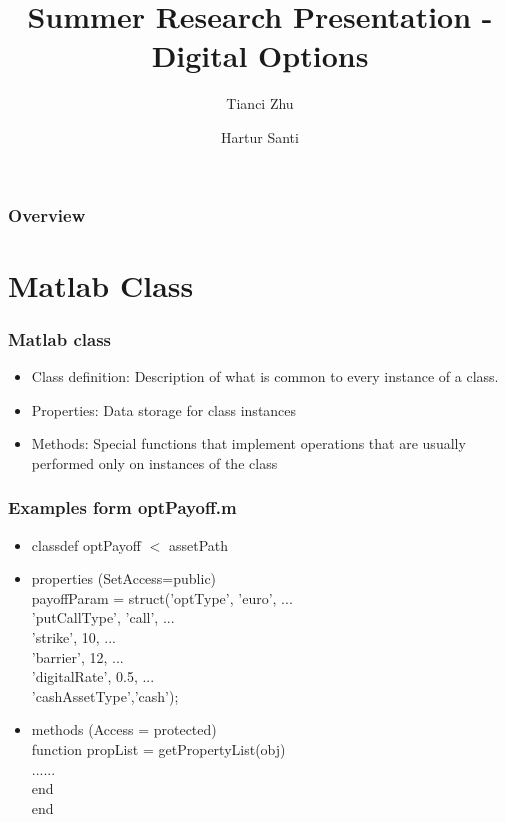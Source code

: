 \documentclass[10pt,Compress]{beamer}
\title[Options]{Summer Research Presentation - Digital Options}
\author{Tianci Zhu \and Hartur Santi}
\institute[IIT]{Illinois Institute of Technology}
\begin{document}
\titlepage


\begin{frame}
\frametitle{Overview}
\tableofcontents
\end{frame}

\section{Matlab Class}
\begin{frame}
\frametitle{Matlab class}
\begin{itemize}
\item Class definition: Description of what is common to every instance of a class.
\item Properties: Data storage for class instances
\item Methods: Special functions that implement operations that are usually performed only on instances of the class
\end{itemize}
\end{frame}

\begin{frame}
\frametitle{Examples form optPayoff.m}
\begin{itemize}
\item classdef optPayoff $<$ assetPath
\item properties (SetAccess=public) \\
\hspace{0.5 cm} payoffParam = struct('optType', {{'euro'}}, ...\\
 \hspace{1.2cm}  'putCallType', {{'call'}}, ...\\ 
 \hspace{1.2cm}       'strike', 10, ... \\
 \hspace{1.2cm}        'barrier', 12, ... \\
 \hspace{1.2cm}      'digitalRate', 0.5, ...\\
 \hspace{1.2cm}     'cashAssetType',{{'cash'}}); 
 \item  methods (Access = protected)\\
 
      \hspace{0.5 cm}function propList = getPropertyList(obj)\\
     \hspace{0.5 cm} ......\\
         \hspace{0.5 cm}end\\
   end
 \end{itemize}
\end{frame}
\end{document}
